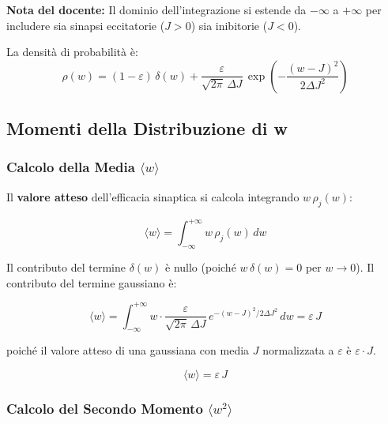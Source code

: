 \begin{tcolorbox}[colback=gray!5, colframe=gray!40, arc=2mm, boxrule=0.5pt]
\textbf{Nota del docente:} Il dominio dell'integrazione si estende da $-\infty$ a $+\infty$ per includere sia sinapsi eccitatorie ($J > 0$) sia inibitorie ($J < 0$). 
\end{tcolorbox}

La densità di probabilità è:
\begin{equation}
    \rho(w)=(1-\varepsilon)\,\delta(w) + \frac{\varepsilon}{\sqrt{2\pi}\,\Delta J}\,\exp\!\left(-\frac{(w - J)^2}{2\Delta J^2}\right)
\end{equation}

\subsection{Momenti della Distribuzione di w}

\subsubsection{Calcolo della Media $\langle w \rangle$}

Il \textbf{valore atteso} dell'efficacia sinaptica si calcola integrando $w\,\rho_j(w)$:

\begin{equation}
\langle w \rangle = \int_{-\infty}^{+\infty} w\,\rho_j(w)\,dw
\end{equation}

Il contributo del termine $\delta(w)$ è nullo (poiché $w\,\delta(w) = 0$ per $w \to 0$). Il contributo del termine gaussiano è:

\begin{equation}
\langle w \rangle = \int_{-\infty}^{+\infty} w \cdot \frac{\varepsilon}{\sqrt{2\pi}\,\Delta J}\,e^{-(w-J)^2/2\Delta J^2}\,dw = \varepsilon\,J
\end{equation}

poiché il valore atteso di una gaussiana con media $J$ normalizzata a $\varepsilon$ è $\varepsilon \cdot J$.

\begin{equation}
\boxed{\langle w \rangle = \varepsilon\, J}
\end{equation}

\subsubsection{Calcolo del Secondo Momento $\langle w^2 \rangle$}


